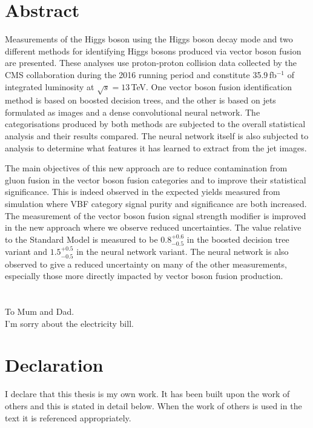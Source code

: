 

\chapter*{\centering Abstract}
Measurements of the Higgs boson using the \Hgg Higgs boson decay mode and two different methods for identifying Higgs bosons produced via vector boson fusion are presented.
These analyses use proton-proton collision data collected by the CMS collaboration during the 2016 running period and constitute 35.9\,fb$^{-1}$ of integrated luminosity at $\sqrt{s}=13$\,TeV.
One vector boson fusion identification method is based on boosted decision trees, and the other is based on jets formulated as images and a dense convolutional neural network. 
The categorisations produced by both methods are subjected to the overall \Hgg statistical analysis and their results compared.
The neural network itself is also subjected to analysis to determine what features it has learned to extract from the jet images.

The main objectives of this new approach are to reduce contamination from gluon fusion in the vector boson fusion categories and to improve their statistical significance. 
This is indeed observed in the expected yields measured from simulation where VBF category signal purity and significance are both increased.
The measurement of the vector boson fusion signal strength modifier is improved in the new approach where we observe reduced uncertainties. 
The value relative to the Standard Model is measured to be $0.8^{+0.6}_{-0.5}$ in the boosted decision tree variant and $1.5^{+0.5}_{-0.5}$ in the neural network variant. 
The neural network is also observed to give a reduced uncertainty on many of the other measurements, especially those more directly impacted by vector boson fusion production.


\chapter*{\centering }%
\begin{center}
    \thispagestyle{empty}
    To Mum and Dad. \\
    I'm sorry about the electricity bill.
\end{center}


\chapter*{\centering Declaration}
I declare that this thesis is my own work. It has been built upon the work of others and this is stated in detail below. 
When the work of others is used in the text it is referenced appropriately.

